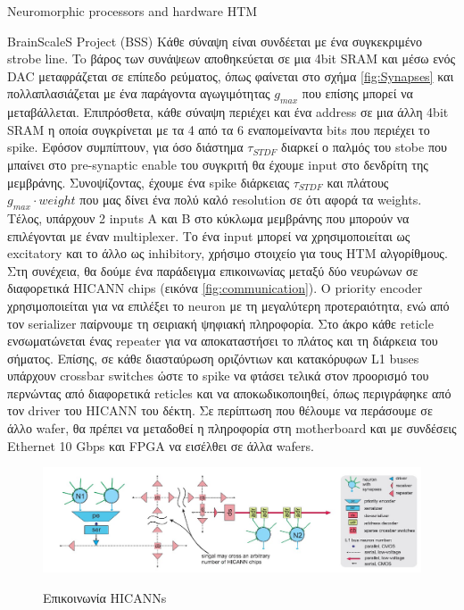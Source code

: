 \documentclass[a4paper,11pt]{article}
\begin{document}
\begin{section}{Neuromorphic processors and hardware HTM}
\begin{subsection}{BrainScaleS Project (BSS)}
    Κάθε σύναψη είναι συνδέεται με ένα συγκεκριμένο strobe line. To βάρος των συνάψεων αποθηκεύεται σε μια 4bit SRAM και μέσω ενός DAC μεταφράζεται σε επίπεδο ρεύματος, όπως φαίνεται στο σχήμα \eqref{fig:Synapses} και πολλαπλασιάζεται με ένα παράγοντα αγωγιμότητας $g_{max}$ που επίσης μπορεί να μεταβάλλεται. Επιπρόσθετα, κάθε σύναψη περιέχει και ένα address σε μια άλλη 4bit SRAM η οποία συγκρίνεται με τα 4 από τα 6 εναπομείναντα bits που περιέχει το spike. Εφόσον συμπίπτουν, για όσο διάστημα $\tau_{STDF}$ διαρκεί ο παλμός του stobe που μπαίνει στο pre-synaptic enable του συγκριτή θα έχουμε input στο δενδρίτη της μεμβράνης. Συνοψίζοντας, έχουμε ένα spike διάρκειας $\tau_{STDF}$ και πλάτους $g_{max}\cdot weight$ που μας δίνει ένα πολύ καλό resolution σε ότι αφορά τα weights. Τέλος, υπάρχουν 2 inputs A και B στο κύκλωμα μεμβράνης που μπορούν να επιλέγονται με έναν multiplexer. Το ένα input μπορεί να χρησιμοποιείται ως excitatory και το άλλο ως inhibitory, χρήσιμο στοιχείο για τους HTM αλγορίθμους.\\
    Στη συνέχεια, θα δούμε ένα παράδειγμα επικοινωνίας μεταξύ δύο νευρώνων σε διαφορετικά HICANN chips (εικόνα \eqref{fig:communication}). O priority encoder χρησιμοποιείται για να επιλέξει το neuron με τη μεγαλύτερη προτεραιότητα, ενώ από τον serializer παίρνουμε τη σειριακή ψηφιακή πληροφορία. Στο άκρο κάθε reticle ενσωματώνεται ένας repeater για να αποκαταστήσει το πλάτος και τη διάρκεια του σήματος. Επίσης, σε κάθε διασταύρωση οριζόντιων και κατακόρυφων L1 buses υπάρχουν crossbar switches ώστε το spike να φτάσει τελικά στον προορισμό του περνώντας από διαφορετικά reticles και να αποκωδικοποιηθεί, όπως περιγράφηκε από τον driver του HICANN του δέκτη. Σε περίπτωση που θέλουμε να περάσουμε σε άλλο wafer, θα πρέπει να μεταδοθεί η πληροφορία στη motherboard και με συνδέσεις Ethernet 10 Gbps και FPGA να εισέλθει σε άλλα wafers.\\
    \begin{figure}[H]
      \centering%
      {\includegraphics[width=\columnwidth,clip=true]{pics/communication.jpg}}
      \caption{Επικοινωνία HICANNs} \label{fig:communication}
    \end{figure}


\end{subsection}
\end{section}
\end{document}
